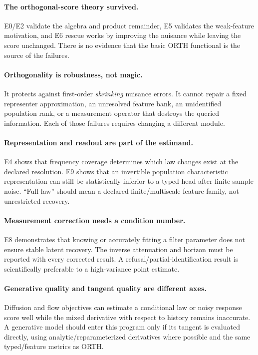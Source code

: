 \documentclass[10.5pt]{article}
\begin{document}
\paragraph{The orthogonal-score theory survived.}
E0/E2 validate the algebra and product remainder, E5 validates the weak-feature motivation, and E6 rescue works by improving the nuisance while leaving the score unchanged.  There is no evidence that the basic ORTH functional is the source of the failures.

\paragraph{Orthogonality is robustness, not magic.}
It protects against first-order \emph{shrinking} nuisance errors.  It cannot repair a fixed representer approximation, an unresolved feature bank, an unidentified population rank, or a measurement operator that destroys the queried information.  Each of those failures requires changing a different module.

\paragraph{Representation and readout are part of the estimand.}
E4 shows that frequency coverage determines which law changes exist at the declared resolution.  E9 shows that an invertible population characteristic representation can still be statistically inferior to a typed head after finite-sample noise.  ``Full-law'' should mean a declared finite/multiscale feature family, not unrestricted recovery.

\paragraph{Measurement correction needs a condition number.}
E8 demonstrates that knowing or accurately fitting a filter parameter does not ensure stable latent recovery.  The inverse attenuation and horizon must be reported with every corrected result.  A refusal/partial-identification result is scientifically preferable to a high-variance point estimate.

\paragraph{Generative quality and tangent quality are different axes.}
Diffusion and flow objectives can estimate a conditional law or noisy response score well while the mixed derivative with respect to history remains inaccurate.  A generative model should enter this program only if its tangent is evaluated directly, using analytic/reparameterized derivatives where possible and the same typed/feature metrics as ORTH.
\end{document}
